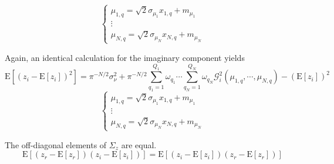 \documentclass{article}         %
\theoremstyle{definition}
\theoremstyle{remark}
\newcommand{\eq}[1]{\begin{equation} #1 \end{equation}}
\newcommand{\Gscript}{\mathcal{G}}
\newcommand{\paren}[1]{\left(#1\right)}
\newcommand{\arr}[2]{\begin{array}{#1} #2 \end{array}}
\newcommand{\expect}[1]{\mathrm{E}\left[#1\right]}
\newcommand{\sumqone}{\sum\limits_{q_1=1}^{Q_1}}
\newcommand{\sumqN}{\sum\limits_{q_N=1}^{Q_N}}
\begin{document}
\eq{\left\{\arr{l}{\mu_{1,q} = \sqrt{2}\sigma_{\mu_1}x_{1,q}+m_{\mu_1} \\ \vdots \\ \mu_{N,q} = \sqrt{2}\sigma_{\mu_N}x_{N,q}+m_{\mu_N}}\right.}

Again, an identical calculation for the imaginary component yields
\eq{\expect{\paren{z_i-\expect{z_i}}^2} = \pi^{-N/2}\sigma_\nu^2+\pi^{-N/2}\sumqone\omega_{q_1}\cdots\sumqN\omega_{q_N}\Gscript_i^2\paren{\mu_{1,q},\cdots,\mu_{N,q}}-\paren{\expect{z_i}}^2}
\eq{\left\{\arr{l}{\mu_{1,q} = \sqrt{2}\sigma_{\mu_1}x_{1,q}+m_{\mu_1} \\ \vdots \\ \mu_{N,q} = \sqrt{2}\sigma_{\mu_N}x_{N,q}+m_{\mu_N}}\right.}

The off-diagonal elements of $\Sigma_z$ are equal.
\eq{\expect{\paren{z_r-\expect{z_r}}\paren{z_i-\expect{z_i}}} = \expect{\paren{z_i-\expect{z_i}}\paren{z_r-\expect{z_r}}}}
\end{document}
